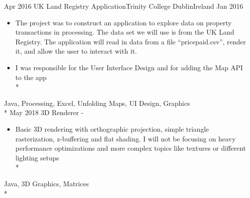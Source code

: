 
\begin{experiences}
  \experience
    {Apr 2016}   {{UK Land Registry Application}}{Trinity College Dublin}{Ireland}
    {Jan 2016} {
                      \begin{itemize}
                        \item  The project was to construct an application to explore data on property transactions in processing. The data set we will use is from the UK Land Registry. The application will read in data from a file “pricepaid.csv”, render it, and allow the user to interact with it. 
 \item I was responsible for the User Interface Design and for adding the Map API to the app\\* 
                      \end{itemize}
                    }
                    {Java, Processing, Excel,  Unfolding Maps, UI Design, Graphics}\\*
  \emptySeparator 
  \experience
    {May 2018} {3D Renderer}{}{}
    {-}    {
                      \begin{itemize}
                        \item Basic 3D rendering with orthographic projection, simple triangle rasterization, z-buffering and flat shading. I will not be focusing on heavy performance optimizations and more complex topics like textures or different lighting setups \\*               
                      \end{itemize}
                    }
                    {Java, 3D Graphics, Matrices}\\*
  \emptySeparator 
\end{experiences}
